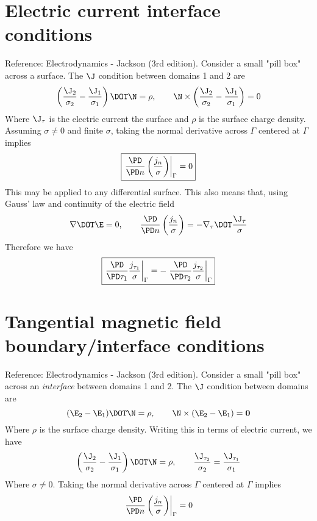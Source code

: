 \documentclass[11pt]{article}
\begin{document}
\section{Electric current interface conditions}
Reference: Electrodynamics - Jackson (3rd edition). Consider a small "pill box" across a surface. The $\J$ condition between domains 1 and 2 are
\begin{equation}
  \left( \frac{\J_2}{\sigma_2} - \frac{\J_1}{\sigma_1} \right) \DOT \N = \rho
  , \qquad
  \N \times \left( \frac{\J_2}{\sigma_2} - \frac{\J_1}{\sigma_1} \right) = 0
\end{equation}
Where $\J_{\tau}$ is the electric current the surface and $\rho$ is the surface charge density. Assuming $\sigma \ne 0$ and finite $\sigma$, taking the normal derivative across $\Gamma$ centered at $\Gamma$ implies
\begin{equation}
  \boxed{
  \left. \frac{\PD}{\PD n} \left(\frac{j_n}{\sigma} \right) \right|_{\Gamma} = 0
  }
\end{equation}
This may be applied to any differential surface. This also means that, using Gauss' law and continuity of the electric field
\begin{equation}
    \nabla \DOT \E = 0
    , \qquad
    \frac{\PD}{\PD n} \left(\frac{j_n}{\sigma} \right) = - \nabla_{\tau} \DOT \frac{\J_{\tau}}{\sigma}
\end{equation}
Therefore we have
\begin{equation}
  \boxed{
  \left. \frac{\PD}{\PD \tau_1} \frac{j_{\tau_1}}{\sigma} \right|_{\Gamma} = -
  \left. \frac{\PD}{\PD \tau_2} \frac{j_{\tau_2}}{\sigma} \right|_{\Gamma}
  }
\end{equation}


\section{Tangential magnetic field boundary/interface conditions}
Reference: Electrodynamics - Jackson (3rd edition). Consider a small "pill box" across an \textit{interface} between domains 1 and 2. The $\J$ condition between domains are
\begin{equation}
    (\E_2 - \E_1) \DOT \N = \rho
    , \qquad
    \N \times (\E_2 - \E_1) = \mathbf{0}
\end{equation}
Where $\rho$ is the surface charge density. Writing this in terms of electric current, we have
\begin{equation}
    \left( \frac{\J_2}{\sigma_2} - \frac{\J_1}{\sigma_1} \right) \DOT \N = \rho
    , \qquad
    \frac{\J_{\tau_2}}{\sigma_2} = \frac{\J_{\tau_1}}{\sigma_1}
\end{equation}
Where $\sigma \ne 0$. Taking the normal derivative across $\Gamma$ centered at $\Gamma$ implies
\begin{equation}
  \left. \frac{\PD}{\PD n} \left( \frac{j_n}{\sigma} \right) \right|_{\Gamma} = 0
\end{equation}
\end{document}
